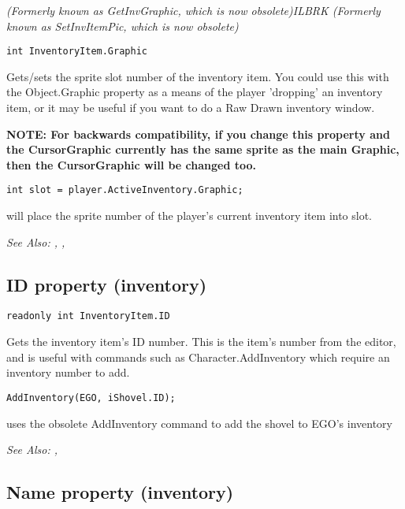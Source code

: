 \it{(Formerly known as GetInvGraphic, which is now obsolete)}ILBRK
\it{(Formerly known as SetInvItemPic, which is now obsolete)}

\begin{verbatim}
int InventoryItem.Graphic
\end{verbatim}
Gets/sets the sprite slot number of the inventory item. You could use this
with the Object.Graphic property as a means of the player 'dropping' an inventory item, or
it may be useful if you want to do a Raw Drawn inventory window.

\bf{NOTE:} For backwards compatibility, if you change this property and the CursorGraphic
currently has the same sprite as the main Graphic, then the CursorGraphic will be changed
too.

\begin{verbatim}
int slot = player.ActiveInventory.Graphic;
\end{verbatim}
will place the sprite number of the player's current inventory item into slot.

\it{See Also:} ,
,


\subsection{ID property (inventory)}\label{InventoryItem.ID}%

\begin{verbatim}
readonly int InventoryItem.ID
\end{verbatim}
Gets the inventory item's ID number. This is the item's number from the editor, and is
useful with commands such as Character.AddInventory which require an inventory number
to add.

\begin{verbatim}
AddInventory(EGO, iShovel.ID);
\end{verbatim}
uses the obsolete AddInventory command to add the shovel to EGO's inventory

\it{See Also:} ,


\subsection{Name property (inventory)}\label{InventoryItem.Name}%


